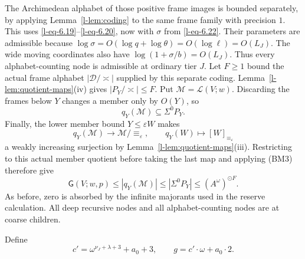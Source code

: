 \documentclass[11pt]{article}
\theoremstyle{definition}
\theoremstyle{remark}
\newcommand{\arch}{\mathrel{\asymp}}
\newcommand{\od}{\mathbin{\odot}}
\newcommand{\GG}{\mathsf G}
\newcommand{\calL}{\mathcal L}
\numberwithin{equation}{section}
\begin{document}
The Archimedean alphabet of those positive frame images is bounded
separately, by applying Lemma~\ref{l-lem:coding} to the same frame
family with precision $1$.
This uses \eqref{l-eq-6.19}--\eqref{l-eq-6.20}, now with $\sigma$ from \eqref{l-eq-6.22}.
Their parameters are admissible because
$\log\sigma=O(\log q+\log\theta)=O(\log\ell)=O(L_J)$.
The wide moving coordinates also have $\log(1+\sigma/b)=O(L_J)$.
Thus every alphabet-counting node is admissible at ordinary tier $J$.
Let $F\ge1$ bound the actual frame alphabet
$|\mathcal D/\arch|$ supplied by this separate coding.
Lemma~\ref{l-lem:quotient-maps}(iv) gives
$|P_Y/\arch|\le F$.  Put $\mathcal M=\calL(V;w)$.
Discarding the frames below $Y$ changes a member only by
$O(Y)$, so
\[
 q_Y(\mathcal M)\subseteq\Sigma^0P_Y.
\]
Finally, the lower member bound $Y\le\varepsilon W$ makes
\[
 q_Y(\mathcal M)\longrightarrow\mathcal M/{\equiv_\varepsilon},
 \qquad q_Y(W)\longmapsto[W]_{\equiv_\varepsilon}
\]
a weakly increasing surjection by
Lemma~\ref{l-lem:quotient-maps}(iii).  Restricting to this
actual member quotient before taking the last map and applying
(BM3) therefore give
\begin{equation}
 \GG(V;w,p)\le |q_Y(\mathcal M)|
       \le|\Sigma^0P_Y|\le(A^\omega)^{\od F}.
 \label{l-eq-6.24}
\end{equation}
As before, zero is absorbed by the infinite majorants used in
the reserve calculation.  All deep recursive nodes and all
alphabet-counting nodes are at coarse children.

Define
\begin{equation}
 c'=\omega^{\nu_J+\lambda+3}+a_0+3,\qquad
 g=c'\cdot\omega+a_0\cdot2.
 \label{deep-reserve}
\end{equation}
\end{document}
